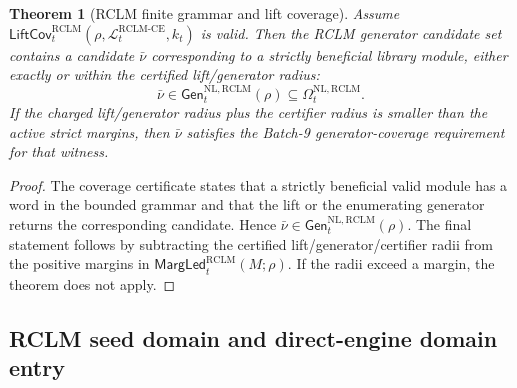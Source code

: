 \documentclass[11pt,a4paper]{article}
\newtheorem{theorem}{Theorem}[section]
\newcommand{\Lcal}{\mathcal L}
\newcommand{\RCLM}{\mathrm{RCLM}}
\newcommand{\NL}{\mathrm{NL}}
\newcommand{\CE}{\mathrm{CE}}
\begin{document}
\begin{theorem}[RCLM finite grammar and lift coverage]
\label{thm:rclm-batch11-finite-grammar-lift-coverage}
Assume \(\mathsf{LiftCov}_t^{\RCLM}(\rho,\Lcal_t^{\RCLM\text{-}\CE},k_t)\) is valid.  Then the RCLM generator candidate set contains a candidate \(\bar\nu\) corresponding to a strictly beneficial library module, either exactly or within the certified lift/generator radius:
\[
\bar\nu\in
\mathsf{Gen}_t^{\NL,\RCLM}(\rho)
\subseteq \Omega_t^{\NL,\RCLM}.
\]
If the charged lift/generator radius plus the certifier radius is smaller than the active strict margins, then \(\bar\nu\) satisfies the Batch-9 generator-coverage requirement for that witness.
\end{theorem}

\begin{proof}
The coverage certificate states that a strictly beneficial valid module has a word in the bounded grammar and that the lift or the enumerating generator returns the corresponding candidate.  Hence \(\bar\nu\in\mathsf{Gen}_t^{\NL,\RCLM}(\rho)\).  The final statement follows by subtracting the certified lift/generator/certifier radii from the positive margins in \(\mathsf{MargLed}_t^{\RCLM}(M;\rho)\).  If the radii exceed a margin, the theorem does not apply.
\end{proof}

\subsection{RCLM seed domain and direct-engine domain entry}
\end{document}
